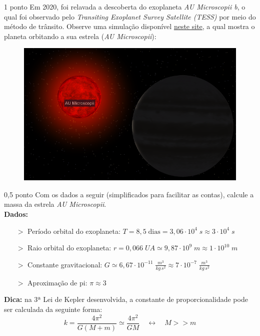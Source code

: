 \documentclass{../lista}
\begin{document}
	\begin{questao}{1 ponto}
		Em 2020, foi relavada a descoberta do exoplaneta \textit{AU Microscopii b}, o qual foi observado pelo \textit{Transiting Exoplanet Survey Satellite (TESS)} por meio do método de trânsito. Observe uma simulação disponível \href{https://exoplanets.nasa.gov/exoplanet-catalog/7635/au-microscopii-b/}{neste site}, a qual mostra o planeta orbitando a sua estrela (\textit{AU Microscopii}):
		\begin{figure}[H]
			\centering
			\includegraphics[scale=0.5]{./img/4.png}
		\end{figure}

		\begin{pergunta}{0,5 ponto}
			Com os dados a seguir (simplificados para facilitar as contas), calcule a massa da estrela \textit{AU Microscopii}. \\
			\textbf{Dados:}
				\begin{itemize}
					\item[$>$] Período orbital do exoplaneta: $T = 8,5 \; \textrm{dias} = 3,06 \cdot 10^4 \; s \approx 3 \cdot 10^4 \; s$
					\item[$>$] Raio orbital do exoplaneta: $r = 0,066 \; UA \simeq 9,87 \cdot 10^9 \; m \approx 1 \cdot 10^{10} \; m$
					\item[$>$] Constante gravitacional: $G \simeq 6,67 \cdot 10^{-11} \; \frac{m^3}{kg \, s^2} \approx 7 \cdot 10^{-7} \; \frac{m^3}{kg \, s^2}$
					\item[$>$] Aproximação de pi: $\pi \approx 3$
				\end{itemize}
			\textbf{Dica:} na 3ª Lei de Kepler desenvolvida, a constante de proporcionalidade pode ser calculada da seguinte forma:
				\begin{equation}
					k = \frac{4 \pi^2}{G(M+m)} \simeq \frac{4 \pi^2}{GM} \quad \leftrightarrow \quad M>>m
				\end{equation}
			

\end{pergunta}
\end{questao}
\end{document}
